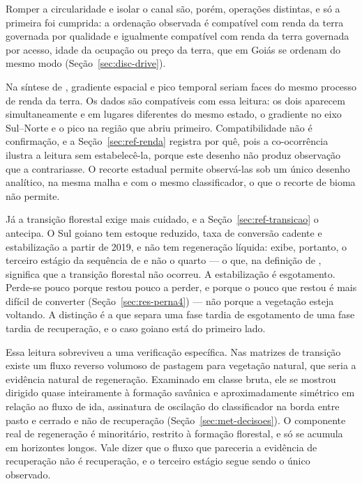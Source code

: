 Romper a circularidade e isolar o canal são, porém, operações distintas, e só a
primeira foi cumprida: a ordenação observada é compatível com renda da terra
governada por qualidade e igualmente compatível com renda da terra governada
por acesso, idade da ocupação ou preço da terra, que em Goiás se ordenam do
mesmo modo (Seção~\ref{sec:disc-drive}).

Na síntese de , gradiente espacial e pico temporal
seriam faces do mesmo processo de renda da terra. Os dados são compatíveis com
essa leitura: os dois aparecem simultaneamente e em lugares diferentes do
mesmo estado, o gradiente no eixo Sul--Norte e o pico na região que abriu
primeiro. Compatibilidade não é confirmação, e a Seção~\ref{sec:ref-renda}
registra por quê, pois a co-ocorrência ilustra a leitura sem estabelecê-la, porque
este desenho não produz observação que a contrariasse. O recorte estadual
permite observá-las sob um único desenho analítico, na mesma malha e com o
mesmo classificador, o que o recorte de bioma não permite.

Já a transição florestal exige mais cuidado, e a Seção~\ref{sec:ref-transicao}
o antecipa. O Sul goiano tem estoque reduzido, taxa de conversão cadente e
estabilização a partir de 2019, e não tem regeneração líquida: exibe,
portanto, o terceiro estágio da sequência de  e não o
quarto --- o que, na definição de , significa que a
transição florestal não ocorreu. A estabilização é esgotamento. Perde-se pouco
porque restou pouco a perder, e porque o pouco que restou é mais difícil de
converter (Seção~\ref{sec:res-perna4}) --- não porque a vegetação esteja
voltando. A distinção é a que separa uma fase tardia de esgotamento de uma
fase tardia de recuperação, e o caso goiano está do primeiro lado.

Essa leitura sobreviveu a uma verificação específica. Nas matrizes
de transição existe um fluxo reverso
volumoso de pastagem para vegetação natural, que seria a evidência natural de
regeneração. Examinado em classe bruta, ele se mostrou dirigido quase
inteiramente à formação savânica e aproximadamente simétrico em relação ao
fluxo de ida, assinatura de oscilação do classificador na borda entre
pasto e cerrado e não de recuperação
(Seção~\ref{sec:met-decisoes}). O componente real de regeneração é
minoritário, restrito à formação florestal, e só se acumula em horizontes
longos. Vale dizer que o fluxo que pareceria a evidência de recuperação não é
recuperação, e o terceiro estágio segue sendo o único observado.


